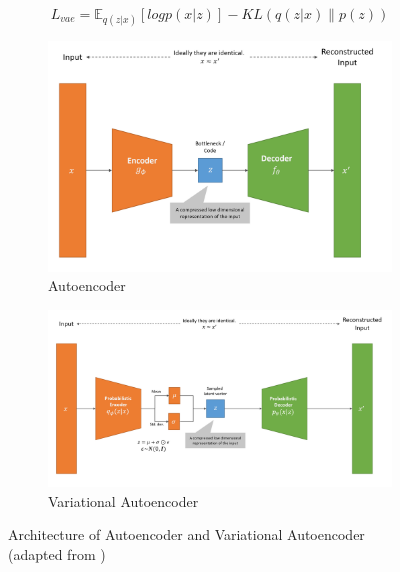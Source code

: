 \begin{equation}
    \label{eqn:vae_loss}
    L_{vae} =\mathbb{E}_{q(z|x)}[logp(x|z)]-KL(q(z|x) \parallel p(z))
\end{equation}


\begin{figure}[H]
  \centering
  \begin{subfigure}{0.8\textwidth}
    \includegraphics[width=\linewidth]{images/ae.png}
    \caption{Autoencoder} \label{fig:ae}
  \end{subfigure}
  \vspace{\baselineskip}   %
  \begin{subfigure}{0.8\textwidth}
    \includegraphics[width=\linewidth]{images/vae.png}
    \caption{Variational Autoencoder} \label{fig:vae}
  \end{subfigure}
\captionsetup{justification=centering}
\caption[Autoencoders]{Architecture of Autoencoder and Variational Autoencoder \\(adapted from \cite{weng2018AutoencoderBetaVAE})} \label{fig:vae_overview}
\end{figure}


